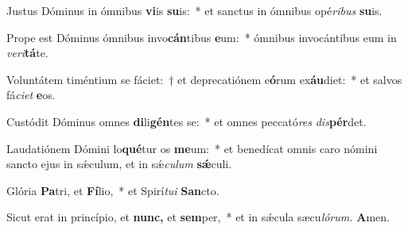 \item Justus Dóminus in ómnibus \textbf{vi}is \textbf{su}is:~* et san\-ctus in ómnibus opé\textit{ribus} \textbf{su}is.
\item Prope est Dóminus ómnibus invo\textbf{cán}tibus \textbf{e}um:~* ómnibus invocántibus eum in \textit{veri}\textbf{tá}te.
\item Voluntátem timéntium se fáciet:~† et deprecatiónem e\textbf{ó}rum ex\textbf{áu}diet:~* et salvos fá\tinyhspace\textit{ciet} \textbf{e}os.
\item Custódit Dóminus omnes \textbf{di}li\textbf{gén}tes se:~* et omnes peccató\textit{res} \textit{dis}\textbf{pér}det.
\item Laudatiónem Dómini lo\textbf{qué}tur os \textbf{me}um:~* et benedícat omnis caro nómini sancto ejus in sǽculum, et in sǽ\tinyhspace\textit{culum} \textbf{sǽ}culi.
\item Glória \textbf{Pa}tri, et \textbf{Fí}lio,~* et Spirí\tinyhspace\textit{tui} \textbf{San}cto.
\item Sicut erat in princípio, et \textbf{nunc,} et \textbf{sem}per,~* et in sǽcula sæcu\tinyhspace\textit{lórum.} \textbf{A}men.